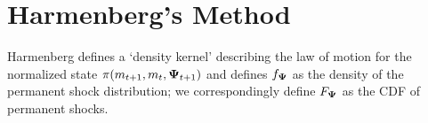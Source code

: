 \documentclass[\econtexRoot/BufferStockTheory]{subfiles}
\begin{document}
\begin{comment}
Consider any configuration of parameter values under which, with the variance of permanent shocks equal to zero, the {\GICRaw} holds exactly:
\begin{equation}\begin{gathered}\begin{aligned}
  \GICRaw & = 1 = \exp\left(\tilde{\Ex}[\log \PermShk]\right)
\end{aligned}\end{gathered}\end{equation}
\end{comment}

\section{Harmenberg's Method}\label{sec:ApndxHarKmenberg}

\newcommand{\PermLvlPrb}{p}
\newcommand{\PermLvlVec}{\mathrm{p}}
\newcommand{\lomdkPrb}{\pi} 
\newcommand{\lomdkPrbmm}{\varpi} 
\newcommand{\lomdkMat}{\Pi}
\newcommand{\Prb}{f}
\newcommand{\Vct}{\digamma}
\newcommand{\PermShkPrb}{\Prb_{\PermShk}}
\newcommand{\PermShkVec}{\Vct_{\PermShk}}
\newcommand{\PermShkRawPrb}{\Prb_{\PermShk}}
\newcommand{\PermShkRawVec}{\Vct_{\PermShk}}
\newcommand{\PermShkWgtPrb}{\tilde{\Prb}_{\PermShk}}
\newcommand{\PermShkWgtVec}{\tilde{\Vct}_{\PermShk}}
\newcommand{\mpPrb}{\chi}
\newcommand{\mpPrbMarg}{\mpPrb^{\mNrm}}
\newcommand{\Wgt}{\tilde}
\newcommand{\Raw}{}
\newcommand{\mpPrbMargRaw}{\Raw{\mpPrb}^{\mNrm}}
\newcommand{\mpPrbMargWgt}{\Wgt{\mpPrb}^{\mNrm}}
\newcommand{\mpMat}{\mathrm{X}}
\newcommand{\mpMatMarg}{\mpMat^{\mNrm}}
\newcommand{\mpMatMargRaw}{\Raw{\mpMat}^{\mNrm}}
\newcommand{\mpMatMargWgt}{\Wgt{\mpMat}^{\mNrm}}
\newcommand{\mNrmVec}{\mathrm{m}}
\newcommand{\mNrmNow}{\mNrm_{t}}
\newcommand{\mNrmNxt}{\mNrm_{t+1}}
\newcommand{\Bot}{\underline}
\newcommand{\mNrmNxtBot}{\Bot{\mNrm}_{t+1}}
\newcommand{\PermShkNow}{\PermShk_{t}}
\newcommand{\PermShkPrbNxt}{\PermShk_{t+1}}
\newcommand{\PermShkPrbBot}{\Bot{\PermShk}}
\newcommand{\PermShkPrbNxtBot}{\Bot{\PermShk}_{t+1}}
\newcommand{\PermLvlPrbNxt}{\PermLvlPrb_{t+1}}
\newcommand{\PermLvlPrbNxtBot}{\Bot{\PermLvlPrb}_{t+1}}
\newcommand{\PermLvlPrbNow}{\PermLvlPrb_{t}}
\newcommand{\TranShkNow}{\TranShk_{t}}
\newcommand{\TranShkNxt}{\TranShk_{t+1}}
\newcommand{\mLvlNow}{\mLvl_{t}}
\newcommand{\mLvlNxt}{\mLvl_{t+1}}

Harmenberg defines a `density kernel' describing the law of motion for the normalized state $\lomdkPrb(\mNrmNxt,\mNrmNow,\PermShkPrbNxt)$ and defines $\PermShkRawPrb$ as the density of the permanent shock distribution; we correspondingly define $F_{\mathbf{\Psi}}$ as the CDF of permanent shocks.
\end{document}
